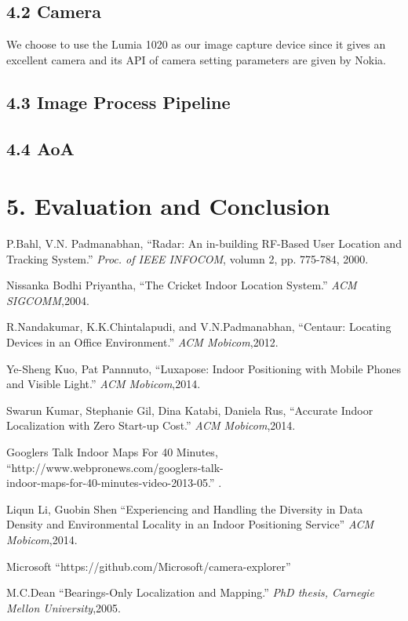 \documentclass[a4paper, 11pt]{article} %
\begin{document}
\subsection*{4.2 Camera}
We choose to use the Lumia 1020 as our image capture device since it gives an excellent camera and its API of camera setting parameters are given by Nokia.

\subsection*{4.3 Image Process Pipeline}
\subsection*{4.4 AoA}

\section*{5. Evaluation and Conclusion}


\begin{thebibliography}{10}
	
P.Bahl, V.N. Padmanabhan,
``Radar: An in-building RF-Based User Location and Tracking System.''
\textit{Proc. of IEEE INFOCOM}, volumn 2, pp. 775-784, 2000.

Nissanka Bodhi Priyantha,
``The Cricket Indoor Location System.''
\textit{ACM SIGCOMM},2004.

R.Nandakumar, K.K.Chintalapudi, and V.N.Padmanabhan,
``Centaur: Locating Devices in an Office Environment.''
\textit{ACM Mobicom},2012.

Ye-Sheng Kuo, Pat Pannnuto,
``Luxapose: Indoor Positioning with Mobile Phones and Visible Light.''
\textit{ACM Mobicom},2014.

Swarun Kumar, Stephanie Gil, Dina Katabi, Daniela Rus,
``Accurate Indoor Localization with Zero Start-up Cost.''
\textit{ACM Mobicom},2014.


Googlers Talk Indoor Maps For 40 Minutes,
``http://www.webpronews.com/googlers-talk-\\indoor-maps-for-40-minutes-video-2013-05.''
\textit{}.

Liqun Li, Guobin Shen
``Experiencing and Handling the Diversity in Data Density and Environmental Locality in an Indoor Positioning Service''
\textit{ACM Mobicom},2014.

Microsoft
``https://github.com/Microsoft/camera-explorer''
\textit{}

M.C.Dean
``Bearings-Only Localization and Mapping.''
\textit{PhD thesis, Carnegie Mellon University},2005.


\end{thebibliography}

\end{document}
